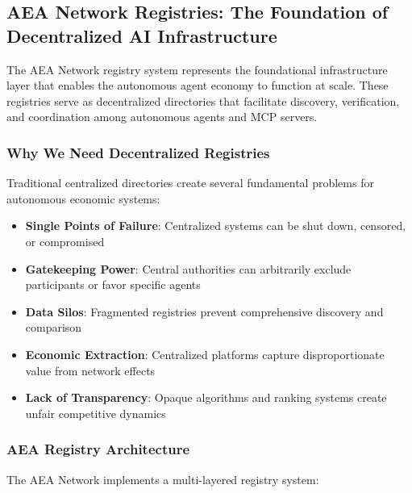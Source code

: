 \documentclass[12pt,a4paper]{article}
\begin{document}
\subsection{AEA Network Registries: The Foundation of Decentralized AI Infrastructure}

The AEA Network registry system represents the foundational infrastructure layer that enables the autonomous agent economy to function at scale. These registries serve as decentralized directories that facilitate discovery, verification, and coordination among autonomous agents and MCP servers.

\subsubsection{Why We Need Decentralized Registries}

Traditional centralized directories create several fundamental problems for autonomous economic systems:

\begin{itemize}
\item \textbf{Single Points of Failure}: Centralized systems can be shut down, censored, or compromised
\item \textbf{Gatekeeping Power}: Central authorities can arbitrarily exclude participants or favor specific agents
\item \textbf{Data Silos}: Fragmented registries prevent comprehensive discovery and comparison
\item \textbf{Economic Extraction}: Centralized platforms capture disproportionate value from network effects
\item \textbf{Lack of Transparency}: Opaque algorithms and ranking systems create unfair competitive dynamics
\end{itemize}

\subsubsection{AEA Registry Architecture}

The AEA Network implements a multi-layered registry system:
\end{document}
